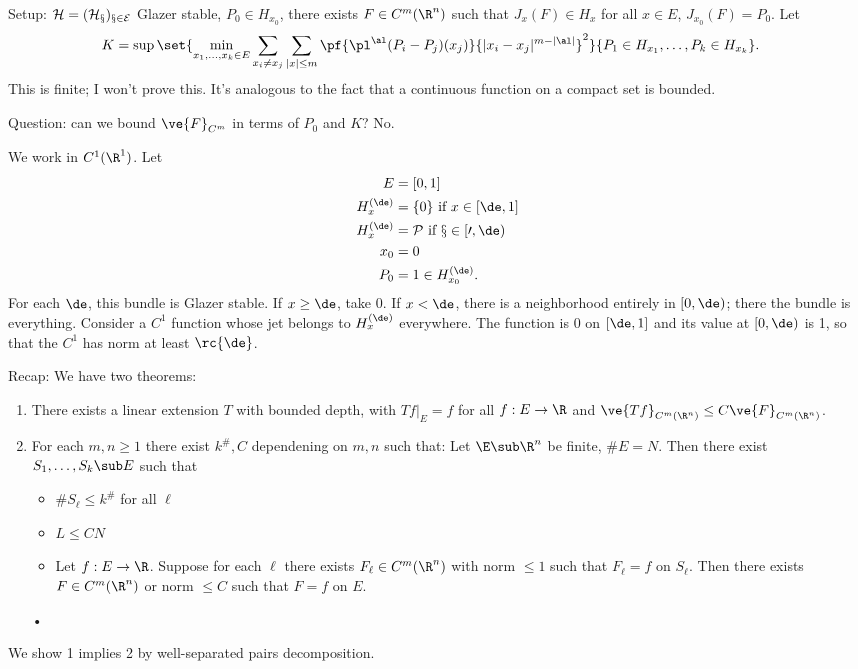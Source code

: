 
Setup: $\cal H=(H_x)_{x\in E}$ Glazer stable, $P_0\in H_{x_0}$, there exists $F\in C^m(\R^n)$ such that $J_x(F)\in H_x$ for all $x\in E$, $J_{x_0}(F)=P_0$. Let
\begin{align}
K&=\sup
\set{\min_{x_1,\ldots, x_k\in E} 
\sum_{x_i\ne x_j} \sum_{|x|\le m}
\pf{\pl^\al(P_i-P_j)(x_j)}{|x_i-x_j|^{m-|\al|}}^2}
{P_1\in H_{x_1},\ldots, P_k\in H_{x_k}}.
\end{align}
This is finite; I won't prove this. It's analogous to the fact that a continuous function on a compact set is bounded.

Question: can we bound $\ve{F}_{C^m}$ in terms of $P_0$ and $K$? No.

We work in $C^1(\R^1)$. Let 
\begin{align}
E&=[0,1]\\
H_x^{(\de)}&=\{0\}\text{ if }x\in [\de,1]\\
H_x^{(\de)}&=\cal P \text{ if }x\in [0,\de)\\
x_0&=0\\
P_0&=1\in H_{x_0}^{(\de)}.
\end{align}
For each $\de$, this bundle is Glazer stable. 
If $x\ge \de$, take 0. If $x<\de$, there is a neighborhood entirely in $[0,\de)$; there the bundle is everything.
Consider a $C^1$ function whose jet belongs to $H_x^{(\de)}$ everywhere. The function is 0 on $[\de,1]$ and its value at $[0,\de)$ is 1, so that the $C^1$ has norm at least $\rc{\de}$.



Recap: We have two theorems:
\begin{enumerate}
\item %
There exists a linear extension $T$ with bounded depth, with $Tf|_E=f$ for all $f:E\to \R$ and $\ve{Tf}_{C^m(\R^n)}\le C\ve{F}_{C^m(\R^n)}$. 
\item 
For each $m,n\ge 1$ there exist $k^\#,C$ dependening on $m,n$ such that:
Let $\E\sub \R^n$ be finite, $\#E=N$. Then there exist $S_1,\ldots, S_k\sub E$ such that 
\begin{itemize}
\item
$\#S_\ell\le k^\#$ for all $\ell$
\item
$L\le CN$\item
Let $f:E\to \R$. Suppose for each $\ell$ there exists $F_\ell\in C^m(\R^n)$ with norm $\le 1$ such that $F_\ell=f$ on $S_\ell$. Then there exists $F\in C^m(\R^n)$ or norm $\le C$ such that $F=f$ on $E$.
\end{itemize}•
\end{enumerate}
We show 1 implies 2 by well-separated pairs decomposition.

